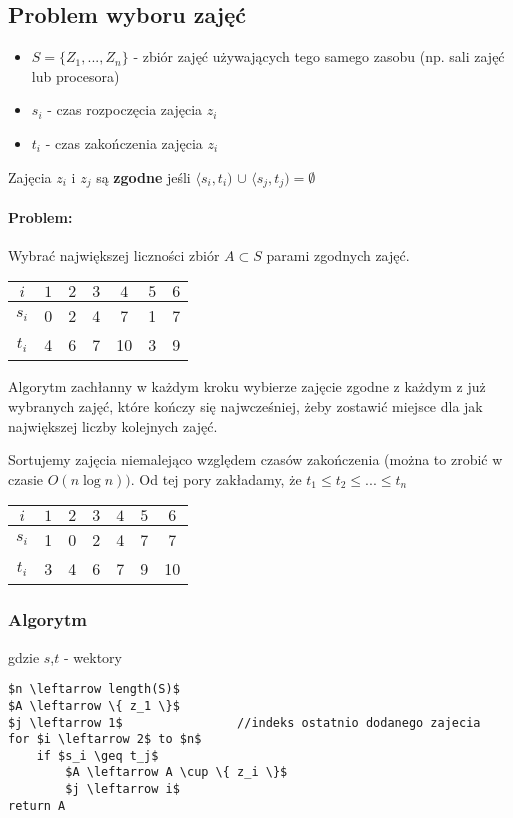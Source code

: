 \subsection{Problem wyboru zajęć}
\begin{itemize}
\item $S = \{ Z_1,...,Z_n \}$ - zbiór zajęć używających tego samego zasobu (np. sali zajęć lub procesora) 
\item $s_i$ - czas rozpoczęcia zajęcia $z_i$
\item $t_i$ - czas zakończenia zajęcia $z_i$
\end{itemize}
Zajęcia $z_i$ i $z_j$ są \textbf{zgodne} jeśli $\langle s_i,t_i)$ $\cup$ $\langle s_j,t_j) = \emptyset$
\paragraph{Problem:}{ Wybrać największej liczności zbiór $A \subset S$ parami zgodnych zajęć.}
\begin{center}
\begin{tabular}{ c | c | c | c | c | c | c }
  $i$ & $1$	& $2$ & $3$ & $4$ & $5$ & $6$ \\ \hline
  $s_i$ & 0	&  2  & 4 	& 7 & 1 & 7 \\ \hline
  $t_i$ & 4	&  6  & 7 	& 10 & 3 & 9 \\  
\end{tabular}
\end{center}

Algorytm zachłanny w każdym kroku wybierze zajęcie zgodne z każdym z już wybranych zajęć, które kończy się najwcześniej, żeby zostawić miejsce dla jak największej liczby kolejnych zajęć.

Sortujemy zajęcia niemalejąco względem czasów zakończenia (można to zrobić w czasie $O(n \log n))$. Od tej pory zakładamy, że $t_1 \leq t_2 \leq ... \leq t_n$

\begin{center}
\begin{tabular}{ c | c | c | c | c | c | c }
  $i$ & $1$	& $2$ & $3$ & $4$ & $5$ & $6$ \\ \hline
  $s_i$ & 1	&  0  &  2	&  4  &  7  & 7 \\ \hline
  $t_i$ & 3	&  4  &  6	&  7  &  9  & 10 \\  
\end{tabular}
\end{center}

\subsubsection{Algorytm}
gdzie $s$,$t$ - wektory
\begin{lstlisting}
$n \leftarrow length(S)$
$A \leftarrow \{ z_1 \}$
$j \leftarrow 1$				//indeks ostatnio dodanego zajecia
for $i \leftarrow 2$ to $n$
	if $s_i \geq t_j$ 
    	$A \leftarrow A \cup \{ z_i \}$
    	$j \leftarrow i$
return A
\end{lstlisting}


